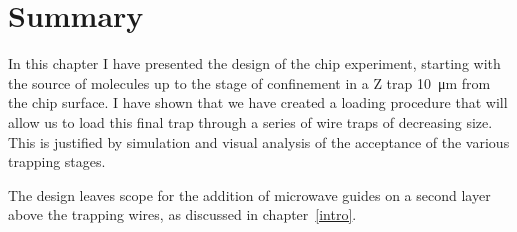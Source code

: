 \section{Summary}

In this chapter I have presented the design of the chip experiment, starting
with the source of molecules up to the stage of confinement in a Z trap
\SI{10}{\micro\meter} from the chip surface. I have shown that we have created
a loading procedure that will allow us to load this final trap through a series
of wire traps of decreasing size. This is justified by simulation and visual
analysis of the acceptance of the various trapping stages.

The design leaves scope for the addition of microwave guides on a second layer
above the trapping wires, as discussed in chapter~\ref{intro}.
